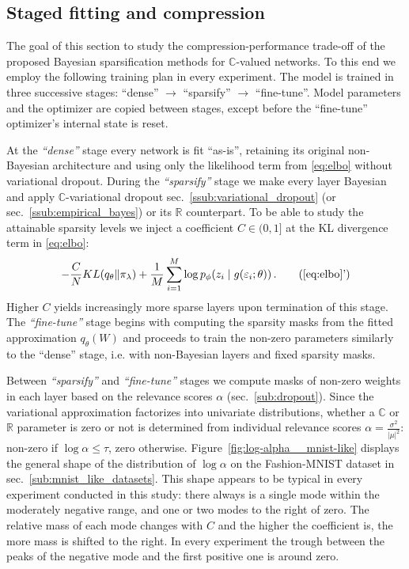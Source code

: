 \documentclass[a4paper,10pt]{article}
\newcommand{\real}{\mathbb{R}}
\newcommand{\cplx}{\mathbb{C}}
\begin{document}
\subsection{Staged fitting and compression} %
\label{sub:fitting_and_compression}

The goal of this section to study the compression-performance trade-off of the proposed Bayesian
sparsification methods for $\cplx$-valued networks. To this end we employ the following training
plan in every experiment. The model is trained in three successive stages: ``dense'' $\to$
``sparsify'' $\to$ ``fine-tune''. Model parameters and the optimizer are copied between
stages, except before the ``fine-tune'' optimizer's internal state is reset.

At the \textit{``dense''} stage every network is fit ``as-is'', retaining its original
non-Bayesian architecture and using only the likelihood term from \eqref{eq:elbo} without
variational dropout.
%
During the \textit{``sparsify''} stage we make every layer Bayesian and apply $\cplx$-variational
dropout sec.~\ref{ssub:variational_dropout} (or sec.~\ref{ssub:empirical_bayes}) or its $\real$
counterpart. To be able to study the attainable sparsity levels we inject a coefficient $
  C \in (0, 1]
$ at the KL divergence term in \eqref{eq:elbo}:
\begin{equation}  \label{eq:elbo_with_coef}
    - \frac{C}N KL(q_{\theta} \| \pi_{\lambda})
    + \frac1{M} \sum_{i=1}^M
        \log p_{\phi}(z_i \mid g(\varepsilon_i; \theta))
    \,. \tag{\ref{eq:elbo}'}
\end{equation}
Higher $C$ yields increasingly more sparse layers upon termination of this stage.
%
The \textit{``fine-tune''} stage begins with computing the sparsity masks from the fitted
approximation $q_\theta(W)$ and proceeds to train the non-zero parameters similarly to
the ``dense'' stage, i.e. with non-Bayesian layers and fixed sparsity masks.

Between \textit{``sparsify''} and \textit{``fine-tune''} stages we compute masks of non-zero
weights in each layer based on the relevance scores $\alpha$ (sec.~\ref{sub:dropout}). Since
the variational approximation factorizes into univariate distributions, whether a $\cplx$
or $\real$ parameter is zero or not is determined from individual relevance scores $
  \alpha = \tfrac{\sigma^2}{\lvert\mu\rvert^2}
$: non-zero if $\log \alpha \leq \tau$, zero otherwise. Figure~\ref{fig:log-alpha__mnist-like}
displays the general shape of the distribution of $\log \alpha$ on the Fashion-MNIST dataset
in sec.~\ref{sub:mnist_like_datasets}. This shape appears to be typical in every experiment
conducted in this study: there always is a single mode within the moderately negative
range, and one or two modes to the right of zero. The relative mass of each mode changes
with $C$ and the higher the coefficient is, the more mass is shifted to the right. In every
experiment the trough between the peaks of the negative mode and the first positive one
is around zero.
\end{document}
